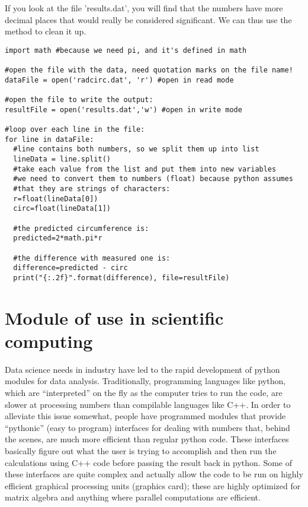 If you look at the file 'results.dat', you will find that the numbers have more decimal places that would really be considered significant. We can thus use the  method to clean it up.

\begin{lstlisting}[frame=single] 
import math #because we need pi, and it's defined in math

#open the file with the data, need quotation marks on the file name!
dataFile = open('radcirc.dat', 'r') #open in read mode

#open the file to write the output:
resultFile = open('results.dat','w') #open in write mode

#loop over each line in the file:
for line in dataFile:
  #line contains both numbers, so we split them up into list
  lineData = line.split()
  #take each value from the list and put them into new variables
  #we need to convert them to numbers (float) because python assumes
  #that they are strings of characters:
  r=float(lineData[0])
  circ=float(lineData[1])
  
  #the predicted circumference is:
  predicted=2*math.pi*r
  
  #the difference with measured one is:
  difference=predicted - circ
  print("{:.2f}".format(difference), file=resultFile)

\end{lstlisting}


\section{Module of use in scientific computing}

Data science needs in industry have led to the rapid development of python modules for data analysis. Traditionally, programming languages like python, which are ``interpreted'' on the fly as the computer tries to run the code, are slower at processing numbers than compilable languages like C++. In order to alleviate this issue somewhat, people have programmed modules that provide ``pythonic'' (easy to program) interfaces for dealing with numbers that, behind the scenes, are much more efficient than regular python code. These interfaces basically figure out what the user is trying to accomplish and then run the calculations using C++ code before passing the result back in python. Some of these interfaces are quite complex and actually allow the code to be run on highly efficient graphical processing units (graphics card); these are highly optimized for matrix algebra and anything where parallel computations are efficient.

